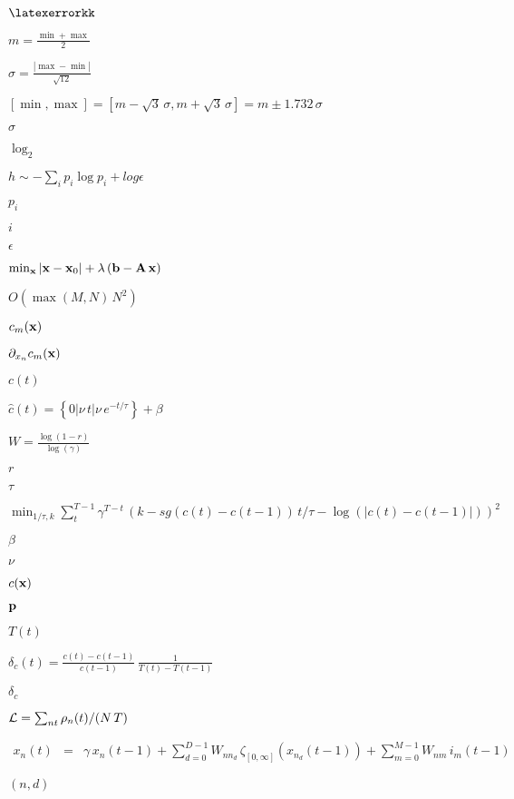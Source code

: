 \documentclass{article}
\begin{document}
$\latexerrorkk$
\pagebreak

$m = \frac{\min + \max}{2}$
\pagebreak

$\sigma = \frac{|\max - \min|}{\sqrt{12}}$
\pagebreak

$[\min, \max] = [m - \sqrt{3} \, \sigma, m + \sqrt{3} \, \sigma] = m \pm 1.732 \, \sigma $
\pagebreak

$\sigma$
\pagebreak

$\log_2$
\pagebreak

$ h \sim - \sum_{i} p_i \log p_i + log \epsilon $
\pagebreak

$p_i$
\pagebreak

$i$
\pagebreak

$\epsilon$
\pagebreak

$\min_{\bf x} |{\bf x} - {\bf x}_0| + \lambda \, ({\bf b} - {\bf A} \, {\bf x}) $
\pagebreak

$O(\max(M,N)\,N^2)$
\pagebreak

$c_m({\bf x})$
\pagebreak

$\partial_{x_n}c_m({\bf x})$
\pagebreak

$c(t)$
\pagebreak

$\hat{c}(t) = \left\{ 0 | \nu \, t | \nu \, e^{-t/\tau} \right\} + \beta$
\pagebreak

$W=\frac{\log(1 - r)}{\log(\gamma)}$
\pagebreak

$r$
\pagebreak

$\tau$
\pagebreak

$\min_{1/\tau, k} \sum_{t}^{T-1} \gamma^{T-t} \, (k - sg(c(t) - c(t-1)) \, t / \tau - \log(|c(t) - c(t-1)|))^2$
\pagebreak

$\beta$
\pagebreak

$\nu$
\pagebreak

$c({\bf x})$
\pagebreak

${\bf p}$
\pagebreak

$T(t)$
\pagebreak

$\delta_c(t) = \frac{c(t) - c(t-1)}{c(t-1)} \, \frac{1}{T(t) - T(t-1)}$
\pagebreak

$\delta_c$
\pagebreak

${\cal L} = \sum_{nt} \rho_n(t) / (N \, T)$
\pagebreak

$\begin{array}{rcl} x_n(t) &=& \gamma \, x_{n}(t-1) + \sum_{d = 0}^{D - 1} W_{nn_d} \, \zeta_{[0,\infty]}\left(x_{n_d}(t-1)\right) + \sum_{m = 0}^{M-1} W_{nm} \, i_m(t-1) \end{array}$
\pagebreak

$(n,d)$
\pagebreak
\end{document}
